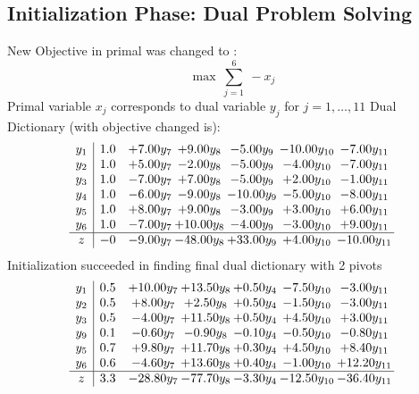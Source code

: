 \documentclass[8pt]{article}
\begin{document}
\subsection{Initialization Phase: Dual Problem Solving}
New Objective in primal was changed to : \[ \max\ \sum_{j=1}^{6}\ - x_j \] 
Primal variable $x_j$ corresponds to dual variable $y_j$ for $j = 1,\ldots,11$
Dual Dictionary (with objective changed is): 
\[\begin{array}{c| c c@{\hskip 2pt} c@{\hskip 2pt} c@{\hskip 2pt} c@{\hskip 2pt} c@{\hskip 2pt} }
 y_{1}   &  1.0 & +  7.00 y_{7} & +  9.00 y_{8} & -5.00 y_{9} & -10.00 y_{10} & -7.00 y_{11}\\
 y_{2}   &  1.0 & +  5.00 y_{7} & -2.00 y_{8} & -5.00 y_{9} & -4.00 y_{10} & -7.00 y_{11}\\
 y_{3}   &  1.0 & -7.00 y_{7} & +  7.00 y_{8} & -5.00 y_{9} & +  2.00 y_{10} & -1.00 y_{11}\\
 y_{4}   &  1.0 & -6.00 y_{7} & -9.00 y_{8} & -10.00 y_{9} & -5.00 y_{10} & -8.00 y_{11}\\
 y_{5}   &  1.0 & +  8.00 y_{7} & +  9.00 y_{8} & -3.00 y_{9} & +  3.00 y_{10} & +  6.00 y_{11}\\
 y_{6}   &  1.0 & -7.00 y_{7} & + 10.00 y_{8} & -4.00 y_{9} & -3.00 y_{10} & +  9.00 y_{11}\\
\hline
z    &  -0 & -9.00 y_{7} & -48.00 y_{8} & + 33.00 y_{9} & +  4.00 y_{10} & -10.00 y_{11}\\
\end{array}\]
Initialization succeeded in finding final dual dictionary with 2 pivots
\[\begin{array}{c| c c@{\hskip 2pt} c@{\hskip 2pt} c@{\hskip 2pt} c@{\hskip 2pt} c@{\hskip 2pt} }
 y_{1}   &  0.5 & + 10.00 y_{7} & + 13.50 y_{8} & +  0.50 y_{4} & -7.50 y_{10} & -3.00 y_{11}\\
 y_{2}   &  0.5 & +  8.00 y_{7} & +  2.50 y_{8} & +  0.50 y_{4} & -1.50 y_{10} & -3.00 y_{11}\\
 y_{3}   &  0.5 & -4.00 y_{7} & + 11.50 y_{8} & +  0.50 y_{4} & +  4.50 y_{10} & +  3.00 y_{11}\\
 y_{9}   &  0.1 & -0.60 y_{7} & -0.90 y_{8} & -0.10 y_{4} & -0.50 y_{10} & -0.80 y_{11}\\
 y_{5}   &  0.7 & +  9.80 y_{7} & + 11.70 y_{8} & +  0.30 y_{4} & +  4.50 y_{10} & +  8.40 y_{11}\\
 y_{6}   &  0.6 & -4.60 y_{7} & + 13.60 y_{8} & +  0.40 y_{4} & -1.00 y_{10} & + 12.20 y_{11}\\
\hline
z    &  3.3 & -28.80 y_{7} & -77.70 y_{8} & -3.30 y_{4} & -12.50 y_{10} & -36.40 y_{11}\\
\end{array}\]
\end{document}
